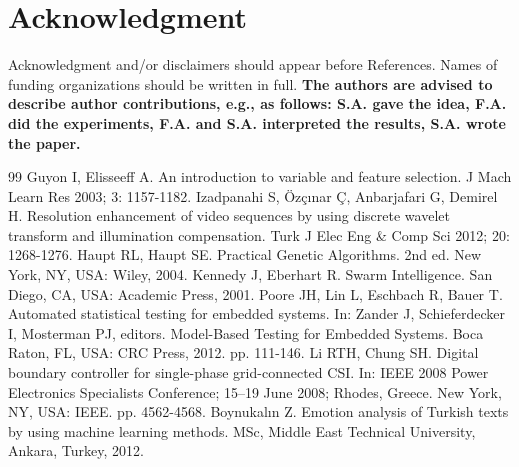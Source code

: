 \documentclass{article}
\begin{document}
\section*{Acknowledgment}
Acknowledgment and/or disclaimers should appear before References. Names of funding organizations should be written in full. \textbf{The authors are advised to describe author contributions, e.g., as follows: S.A. gave the idea, F.A. did the experiments, F.A. and S.A. interpreted the results, S.A. wrote the paper.} 


\begin{thebibliography}{99}
 Guyon I, Elisseeff A. An introduction to variable and feature selection. J Mach Learn Res 2003; 3: 1157-1182.
 Izadpanahi S, \"{O}z\c{c}\i nar \c{C}, Anbarjafari G, Demirel H. Resolution enhancement of video sequences by using discrete wavelet transform and illumination compensation. Turk J Elec Eng {\&} Comp Sci 2012; 20: 1268-1276.
 Haupt RL, Haupt SE. Practical Genetic Algorithms. 2nd ed. New York, NY, USA: Wiley, 2004.
 Kennedy J, Eberhart R. Swarm Intelligence. San Diego, CA, USA: Academic Press, 2001. 
 Poore JH, Lin L, Eschbach R, Bauer T. Automated statistical testing for embedded systems. In: Zander J, Schieferdecker I, Mosterman PJ, editors. Model-Based Testing for Embedded Systems. Boca Raton, FL, USA: CRC Press, 2012. pp. 111-146.
 Li RTH, Chung SH. Digital boundary controller for single-phase grid-connected CSI. In: IEEE 2008 Power Electronics Specialists Conference; 15--19 June 2008; Rhodes, Greece. New York, NY, USA: IEEE. pp. 4562-4568.
 Boynukal\i n Z. Emotion analysis of Turkish texts by using machine learning methods. MSc, Middle East Technical University, Ankara, Turkey, 2012.
\end{thebibliography}
\end{document}
